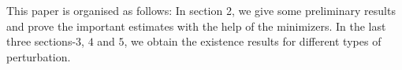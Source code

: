 \documentclass[reqno]{amsart}
\newcommand{\la} {\lambda}
\numberwithin{theorem}{section} \numberwithin{equation}{section}
\begin{document}
This paper is organised as follows: 
In section 2, we give some preliminary results and prove the important estimates with the help of the minimizers. 
 In the last three sections-$3$, $4$ and $5$, we obtain the existence results for different types of perturbation.

\end{document}
